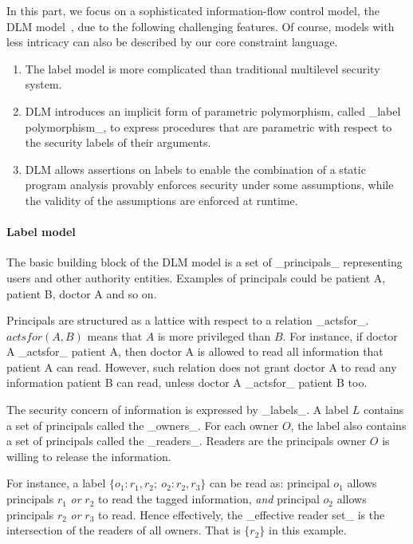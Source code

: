 In this part, we focus on a sophisticated information-flow control model, the
DLM model~\cite{ml-ifc-97}, due to the following challenging features. Of
course, models with less intricacy can also be described by our core constraint
language.

\begin{enumerate}
\item The label model is more complicated than traditional multilevel security
system.

\item DLM introduces an implicit form of parametric polymorphism, called _label
polymorphism_, to express procedures that are parametric with respect to the
security labels of their arguments.

\item DLM allows assertions on labels to enable the combination of a static
program analysis provably enforces security under some assumptions, while the
validity of the assumptions are enforced at runtime. 
\end{enumerate}

\paragraph{Label model}

The basic building block of the DLM model is a set of _principals_ representing
users and other authority entities. Examples of principals could be patient A,
patient B, doctor A and so on. 

Principals are structured as a lattice with respect to a relation _actsfor_.
$actsfor(A,B)$ means that $A$ is more privileged than $B$.
% 
For instance, if doctor A _actsfor_ patient A, then doctor A is allowed to read
all information that patient A can read. However, such relation does not grant
doctor A to read any information patient B can read, unless doctor A _actsfor_
patient B too.

The security concern of information is expressed by _labels_. A label $L$
contains a set of principals called the _owners_. For each owner $O$, the label
also contains a set of principals called the _readers_. Readers are the
principals owner $O$ is willing to release the information. 

For instance, a label $\{o_1:r_1,r_2;\ o_2:r_2,r_3\}$ can be read as: principal
$o_1$ allows principals $r_1$ \emph{or} $r_2$ to read the tagged information,
\emph{and} principal $o_2$ allows principals $r_2$ \emph{or} $r_3$ to read.
Hence effectively, the _effective reader set_ is the intersection of the
readers of all owners. That is $\{r_2\}$ in this example.


